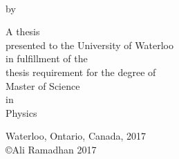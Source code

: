 \begin{titlepage}
    \begin{center}
      \Large  
      
      \hfill
      
      \vfill
      
      \begingroup
      \color{Maroon}{\Large \spacedallcaps{\myTitle}} \\ \bigskip
      \endgroup
      
      by \\ \bigskip
      
      \spacedlowsmallcaps{\myName}
      
      \vfill
      
      A thesis \\
      presented to the University of Waterloo \\
      in fulfillment of the \\
      thesis requirement for the degree of \\
      Master of Science \\
      in \\
      Physics
      
      \vfill
      
      Waterloo, Ontario, Canada, 2017 \\
      \copyright Ali Ramadhan 2017
      
      \vfill
      
    \end{center}
\end{titlepage}  
